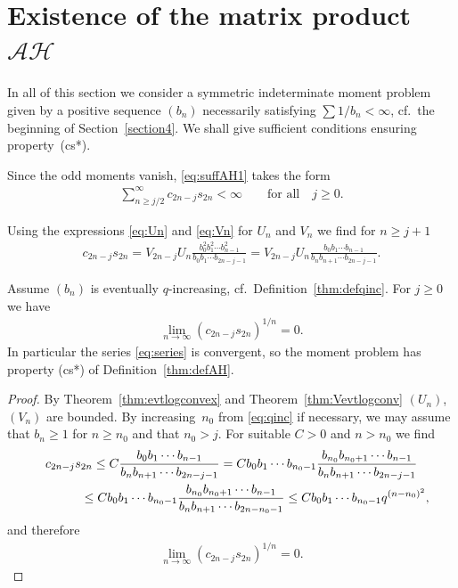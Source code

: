 \section[Existence of the matrix product $\mathcal A\mathcal H$]{Existence of the matrix product $\boldsymbol{\mathcal A\mathcal H}$}\label{section5}

In all of this section we consider a symmetric indeterminate moment problem given by a positive sequence $(b_n)$ necessarily satisfying $\sum 1/b_n<\infty$, cf.\ the beginning of Section~\ref{section4}. We shall give sufficient conditions ensuring property~(cs*).

Since the odd moments vanish, \eqref{eq:suffAH1} takes the form
\begin{gather}\label{eq:series}
\sum_{n\ge j/2}^\infty c_{2n-j}s_{2n}<\infty\qquad\text{for all}\quad j\ge 0.
\end{gather}

Using the expressions \eqref{eq:Un} and \eqref{eq:Vn} for $U_n$ and $V_n$ we find for $n\ge j+1$
 \begin{gather}\label{eq:UnVn}
c_{2n-j}s_{2n}= V_{2n-j}U_n\frac{b_0^2b_1^2\cdots b_{n-1}^2}{b_0b_1\cdots b_{2n-j-1}} =V_{2n-j}U_n\frac{b_0b_1\cdots b_{n-1}}{b_nb_{n+1}\cdots b_{2n-j-1}}.
\end{gather}

\begin{thm}\label{thm:AH-logcv2}Assume $(b_n)$ is eventually $q$-increasing, cf.\ Definition~{\rm \ref{thm:defqinc}}. For $j\ge 0$ we have
\begin{gather*}
\lim_{n\to \infty} (c_{2n-j}s_{2n})^{1/n}=0.
\end{gather*}
In particular the series \eqref{eq:series} is convergent, so the moment problem has property {\rm (cs*)} of Definition~{\rm \ref{thm:defAH}}.
\end{thm}

\begin{proof}By Theorem~\ref{thm:evtlogconvex} and Theorem~\ref{thm:Vevtlogconv} $(U_n)$, $(V_n)$ are bounded. By increasing~$n_0$ from \eqref{eq:qinc} if necessary, we may assume that $b_n\ge 1$ for $n\ge n_0$ and that $n_0>j$. For suitable $C>0$ and $n>n_0$ we find
\begin{gather*}
c_{2n-j}s_{2n} \le C{b_0b_1\cdots b_{n-1}\over b_nb_{n+1}\cdots b_{2n-j-1}} =Cb_0b_1\cdots b_{n_0-1}{b_{n_0}b_{n_0+1}\cdots b_{n-1}\over b_nb_{n+1}\cdots b_{2n-j-1}}\\
\hphantom{c_{2n-j}s_{2n}}{} \le C b_0b_1\cdots b_{n_0-1}{b_{n_0}b_{n_0+1}\cdots b_{n-1}\over b_nb_{n+1}\cdots b_{2n-n_0-1} }\le C b_0b_1\cdots b_{n_0-1}q^{(n-n_0)^2},
\end{gather*}
and therefore
\begin{gather*}
\lim_{n\to\infty}(c_{2n-j}s_{2n})^{1/n}=0.\tag*{\qed}
\end{gather*}\renewcommand{\qed}{}
\end{proof}
